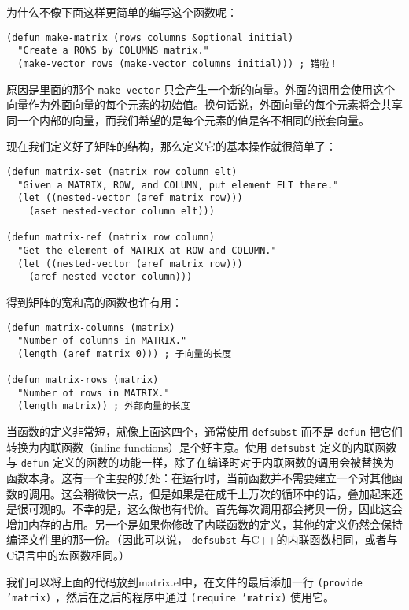 为什么不像下面这样更简单的编写这个函数呢：

\begin{verbatim}
(defun make-matrix (rows columns &optional initial)
  "Create a ROWS by COLUMNS matrix."
  (make-vector rows (make-vector columns initial))) ; 错啦！
\end{verbatim}

原因是里面的那个 \texttt{make-vector} 只会产生一个新的向量。外面的调用会使用这个向量作为外面向量的每个元素的初始值。换句话说，外面向量的每个元素将会共享同一个内部的向量，而我们希望的是每个元素的值是各不相同的嵌套向量。

现在我们定义好了矩阵的结构，那么定义它的基本操作就很简单了：

\begin{verbatim}
(defun matrix-set (matrix row column elt)
  "Given a MATRIX, ROW, and COLUMN, put element ELT there."
  (let ((nested-vector (aref matrix row)))
    (aset nested-vector column elt)))

(defun matrix-ref (matrix row column)
  "Get the element of MATRIX at ROW and COLUMN."
  (let ((nested-vector (aref matrix row)))
    (aref nested-vector column)))
\end{verbatim}

得到矩阵的宽和高的函数也许有用：

\begin{verbatim}
(defun matrix-columns (matrix)
  "Number of columns in MATRIX."
  (length (aref matrix 0))) ; 子向量的长度

(defun matrix-rows (matrix)
  "Number of rows in MATRIX."
  (length matrix)) ; 外部向量的长度
\end{verbatim}

当函数的定义非常短，就像上面这四个，通常使用 \texttt{defsubst} 而不是 \texttt{defun} 把它们转换为内联函数（inline functions）是个好主意。使用 \texttt{defsubst} 定义的内联函数与 \texttt{defun} 定义的函数的功能一样，除了在编译时对于内联函数的调用会被替换为函数本身。这有一个主要的好处：在运行时，当前函数并不需要建立一个对其他函数的调用。这会稍微快一点，但是如果是在成千上万次的循环中的话，叠加起来还是很可观的。不幸的是，这么做也有代价。首先每次调用都会拷贝一份，因此这会增加内存的占用。另一个是如果你修改了内联函数的定义，其他的定义仍然会保持编译文件里的那一份。（因此可以说， \texttt{defsubst} 与C++的内联函数相同，或者与C语言中的宏函数相同。）

我们可以将上面的代码放到matrix.el中，在文件的最后添加一行 \texttt{(provide 'matrix)} ，然后在之后的程序中通过 \texttt{(require 'matrix)} 使用它。

